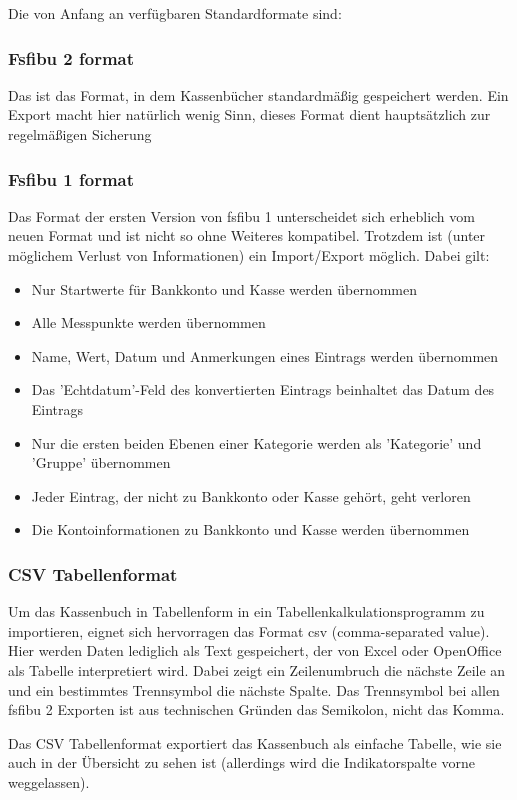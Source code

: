 \documentclass[a4paper,10pt,halfparskip,oneside,smallheadings]{scrbook}
\begin{document}
Die von Anfang an verfügbaren Standardformate sind:
\subsubsection{Fsfibu 2 format}
Das ist das Format, in dem Kassenbücher standardmäßig gespeichert werden. Ein Export macht hier natürlich wenig Sinn, dieses Format dient hauptsätzlich zur regelmäßigen Sicherung
\subsubsection{Fsfibu 1 format}
Das Format der ersten Version von fsfibu 1 unterscheidet sich erheblich vom neuen Format und ist nicht so ohne Weiteres kompatibel. Trotzdem ist (unter möglichem Verlust von Informationen) ein Import/Export möglich. Dabei gilt:
\begin{itemize}
 \item Nur Startwerte für Bankkonto und Kasse werden übernommen
 \item Alle Messpunkte werden übernommen
 \item Name, Wert, Datum und Anmerkungen eines Eintrags werden übernommen
 \item Das 'Echtdatum'-Feld des konvertierten Eintrags beinhaltet das Datum des Eintrags
 \item Nur die ersten beiden Ebenen einer Kategorie werden als 'Kategorie' und 'Gruppe' übernommen
 \item Jeder Eintrag, der nicht zu Bankkonto oder Kasse gehört, geht verloren
 \item Die Kontoinformationen zu Bankkonto und Kasse werden übernommen
\end{itemize}
\subsubsection{CSV Tabellenformat}
Um das Kassenbuch in Tabellenform in ein Tabellenkalkulationsprogramm zu importieren, eignet sich hervorragen das Format csv (comma-separated value). Hier werden Daten lediglich als Text gespeichert, der von Excel oder OpenOffice als Tabelle interpretiert wird. Dabei zeigt ein Zeilenumbruch die nächste Zeile an und ein bestimmtes Trennsymbol die nächste Spalte. Das Trennsymbol bei allen fsfibu 2 Exporten ist aus technischen Gründen das Semikolon, nicht das Komma.

Das CSV Tabellenformat exportiert das Kassenbuch als einfache Tabelle, wie sie auch in der Übersicht zu sehen ist (allerdings wird die Indikatorspalte vorne weggelassen).
\end{document}
